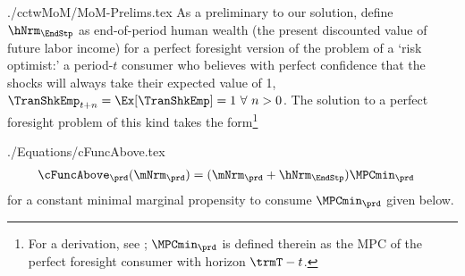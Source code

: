 \documentclass[\econtexRoot/SolvingMicroDSOPs]{subfiles}
\begin{document}
\begin{verbatimwrite}{./cctwMoM/MoM-Prelims.tex}
  As a preliminary to our solution, define $\hNrm_{\EndStp}$ as end-of-period human wealth (the present discounted value of future labor income) for a perfect foresight version of the problem of a `risk optimist:' a period-$t$ consumer who believes with perfect confidence that the shocks will always take their expected value of   {1, $\TranShkEmp_{t+n} = \Ex[\TranShkEmp]=1~\forall~n>0$.}  The solution to a perfect foresight problem of this kind takes the form\footnote{For a derivation, see \cite{BufferStockTheory}; $\MPCmin_{\prd}$ is defined therein as the MPC of the perfect foresight consumer with horizon $\trmT-t$.}
\end{verbatimwrite}
\unskip
\begin{verbatimwrite}{./Equations/cFuncAbove.tex}
  \begin{equation}\begin{gathered}\begin{aligned}
        \cFuncAbove_{\prd}(\mNrm_{\prd})  & = (\mNrm_{\prd} + \hNrm_{\EndStp})\MPCmin_{\prd} \label{eq:cFuncAbove}
      \end{aligned}\end{gathered}\end{equation}
  for a constant minimal marginal propensity to consume $\MPCmin_{\prd}$ given below.
\end{verbatimwrite}
\unskip
\end{document}
